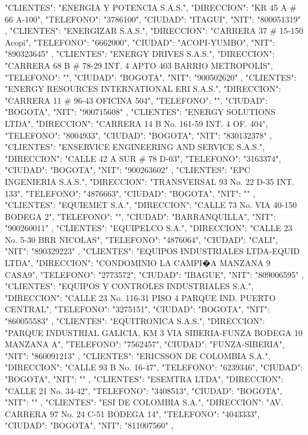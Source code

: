   {
   "CLIENTES": "ENERGIA Y POTENCIA S.A.S.",
   "DIRECCION": "KR 45 A # 66 A-100",
   "TELEFONO": "3786100",
   "CIUDAD": "ITAGUI",
   "NIT": "800051319"
   },
   {
   "CLIENTES": "ENERGIZAR S.A.S.",
   "DIRECCION": "CARRERA 37 # 15-150 Acopi",
   "TELEFONO": "6662000",
   "CIUDAD": "ACOPI-YUMBO",
   "NIT": "890323645"
   },
   {
   "CLIENTES": "ENERGY DRIVES S.A.S.",
   "DIRECCION": "CARRERA 68 B # 78-29 INT. 4 APTO 403 BARRIO METROPOLIS",
   "TELEFONO": "",
   "CIUDAD": "BOGOTA",
   "NIT": "900502620"
   },
   {
   "CLIENTES": "ENERGY RESOURCES INTERNATIONAL ERI S.A.S.",
   "DIRECCION": "CARRERA 11 # 96-43 OFICINA 504",
   "TELEFONO": "",
   "CIUDAD": "BOGOTA",
   "NIT": "900715608"
   },
   {
   "CLIENTES": "ENERGY SOLUTIONS LTDA",
   "DIRECCION": "CARRERA 14 B No. 161-59 INT. 4 OF. 404",
   "TELEFONO": "8004933",
   "CIUDAD": "BOGOTA",
   "NIT": "830132378"
   },
   {
   "CLIENTES": "ENSERVICE ENGINEERING AND SERVICE S.A.S.",
   "DIRECCION": "CALLE 42 A SUR # 78 D-03",
   "TELEFONO": "3163374",
   "CIUDAD": "BOGOTA",
   "NIT": "900263602"
   },
   {
   "CLIENTES": "EPC INGENIERIA S.A.S.",
   "DIRECCION": "TRANSVERSAL 93 No. 22 D-35 INT. 133",
   "TELEFONO": "4876663",
   "CIUDAD": "BOGOTA",
   "NIT": ""
   },
   {
   "CLIENTES": "EQUIEMET S.A.",
   "DIRECCION": "CALLE 73 No. VIA 40-150 BODEGA 2",
   "TELEFONO": "",
   "CIUDAD": "BARRANQUILLA",
   "NIT": "900260011"
   },
   {
   "CLIENTES": "EQUIPELCO S.A.",
   "DIRECCION": "CALLE 23 No. 5-30 BRR NICOLAS",
   "TELEFONO": "4876064",
   "CIUDAD": "CALI",
   "NIT": "890329223"
   },
   {
   "CLIENTES": "EQUIPOS INDUSTRIALES LTDA-EQUID LTDA",
   "DIRECCION": "CONDOMINIO LA CAMPI�A MANZANA 9 CASA9",
   "TELEFONO": "2773572",
   "CIUDAD": "IBAGUE",
   "NIT": "809006595"
   },
   {
   "CLIENTES": "EQUIPOS Y CONTROLES INDUSTRIALES S.A.",
   "DIRECCION": "CALLE 23 No. 116-31 PISO 4 PARQUE IND. PUERTO CENTRAL",
   "TELEFONO": "3275151",
   "CIUDAD": "BOGOTA",
   "NIT": "860055583"
   },
   {
   "CLIENTES": "EQUITRONICA S.A.S.",
   "DIRECCION": "PARQUE INDUSTRIAL GALICIA, KM 3 VIA SIBERIA-FUNZA BODEGA 10 MANZANA A",
   "TELEFONO": "7562457",
   "CIUDAD": "FUNZA-SIBERIA",
   "NIT": "860091213"
   },
   {
   "CLIENTES": "ERICSSON DE COLOMBIA S.A.",
   "DIRECCION": "CALLE 93 B No. 16-47",
   "TELEFONO": "6239346",
   "CIUDAD": "BOGOTA",
   "NIT": ""
   },
   {
   "CLIENTES": "ESEMTRA LTDA",
   "DIRECCION": "CALLE 21 No. 34-42",
   "TELEFONO": "3408513",
   "CIUDAD": "BOGOTA",
   "NIT": ""
   },
   {
   "CLIENTES": "ESI DE COLOMBIA S.A.",
   "DIRECCION": "AV. CARRERA 97 No. 24 C-51 BODEGA 14",
   "TELEFONO": "4043333",
   "CIUDAD": "BOGOTA",
   "NIT": "811007560"
   },
